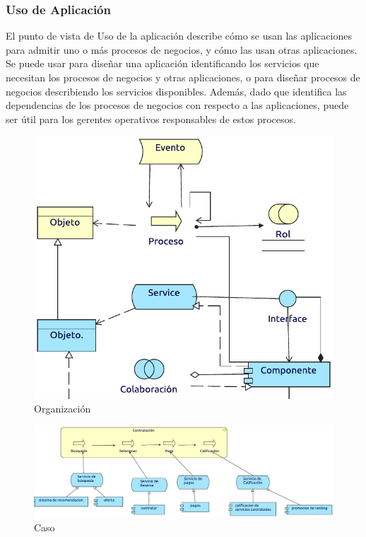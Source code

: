 \subsubsection{Uso de Aplicación}
El punto de vista de Uso de la aplicación describe cómo se usan las aplicaciones para admitir uno o más procesos de negocios, y cómo las usan otras aplicaciones. Se puede usar para diseñar una aplicación identificando los servicios que necesitan los procesos de negocios y otras aplicaciones, o para diseñar procesos de negocios describiendo los servicios disponibles. Además, dado que identifica las dependencias de los procesos de negocios con respecto a las aplicaciones, puede ser útil para los gerentes operativos responsables de estos procesos.
\begin{figure}[h!]
	\centering
	\includegraphics[width=0.9\linewidth]{Desarrollo/ArquitecturaEmpresarial/Aplicacion/imgs/uso.pdf}
	\caption{Organización}
\end{figure}
\newpage
{}

\begin{figure}[h!]
	\centering
	\includegraphics[width=\linewidth]{Desarrollo/ArquitecturaEmpresarial/Aplicacion/imgs/usoMetamodelo.pdf}
	\caption{Caso}
\end{figure}